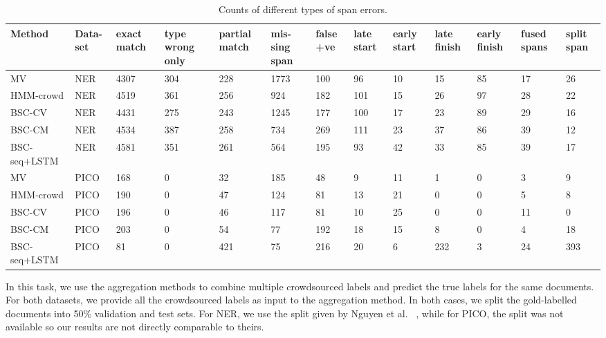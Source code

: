 \begin{table}
\small
\begin{tabularx}{\textwidth}{| l | X | X | X | X | X | X | X | X | X | X | X | X |}
\hline
Method & Data-set & exact match & type wrong only & partial match & mis-sing span & false +ve & late start & early start & late finish & early finish & fused spans & split span \\ \hline
MV & NER & 4307 & 304 & 228 & 1773 & 100 & 96 & 10 & 15 & 85 & 17 & 26 \\
HMM-crowd & NER & 4519 & 361 & 256 & 924 & 182 & 101 & 15 & 26 & 97 & 28 & 22 \\
BSC-CV & NER & 4431 & 275 & 243 & 1245 & 177 & 100 & 17 & 23 & 89 & 29 & 16 \\
BSC-CM & NER & 4534 & 387 & 258 & 734 & 269 & 111 & 23 & 37 & 86 & 39 & 12 \\
BSC-seq+LSTM & NER & 4581 & 351 & 261 & 564 & 195 & 93 & 42 & 33 & 85 & 39 & 17 \\
\hline
MV & PICO    & 168 & 0 & 32 & 185 & 48 & 9 & 11 & 1 & 0 & 3 & 9 \\
HMM-crowd    & PICO & 190 & 0 & 47 & 124 & 81 & 13 & 21 & 0 & 0 & 5 & 8 \\
BSC-CV       & PICO & 196 & 0 & 46 & 117 & 81 & 10 & 25 & 0 & 0 & 11 & 0 \\
BSC-CM       & PICO & 203 & 0 & 54 & 77 & 192 & 18 & 15 & 8 & 0 & 4 & 18 \\
BSC-seq+LSTM & PICO & 81 & 0 & 421 & 75 & 216 & 20 & 6 & 232 & 3 & 24 & 393 \\
\hline
\end{tabularx}
\caption{Counts of different types of span errors.}
\label{tab:error_analysis}
\end{table}
In this task, we use the aggregation methods to combine multiple crowdsourced labels and predict the true labels for the same documents. 
For both datasets, we provide all the crowdsourced labels as input to the aggregation method. 
In both cases, we split the gold-labelled documents into 50\% validation and test sets. 
For NER, we use the split given by Nguyen et al. ~,
while for PICO, the split was not available so our results are not directly comparable to theirs.


